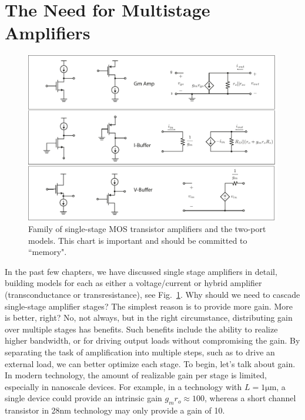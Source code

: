 \section{The Need for Multistage Amplifiers}
\begin{figure}[tb]
\begin{center}
\includegraphics[width=\columnwidth]{ampchart_models}
\end{center}
\caption{Family of single-stage MOS transistor amplifiers and the two-port models.  This chart is important and should be committed to ``memory".}
\label{fig:ampchart_models_fig}
\end{figure}
In the past few chapters, we have discussed single stage amplifiers in detail, building models for each as either a voltage/current or hybrid amplifier (transconductance or transresistance), see Fig.~\ref{fig:ampchart_models_fig}.  Why should we need to cascade single-stage amplifier stages?  The simplest reason is to provide more gain.   More is better, right? No, not always, but in the right circumstance, distributing gain over multiple stages has benefits. Such benefits include the ability to realize higher bandwidth, or for driving output loads without compromising the gain.  By separating the task of amplification into multiple steps, such as to drive an external load, we can better optimize each stage.
To begin, let's talk about gain.  In modern technology, the amount of realizable gain per stage is  limited, especially in nanoscale devices.  For example, in a technology with $L = 1\mathrm{\mu m}$, a single device could provide an intrinsic gain $g_m r_o \approx 100$, whereas a short channel transistor in 28nm technology may only provide a gain of 10.  
